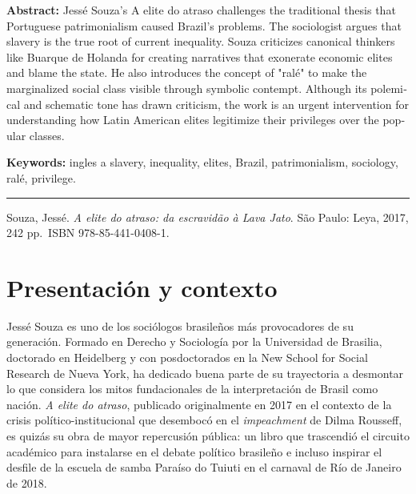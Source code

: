 \documentclass{article}
\renewcommand{\normalsize}{\fontsize{10pt}{13pt}\selectfont}
\renewenvironment{quote}{\normalsize\list{}{\sf\leftmargin=14pt\rightmargin=0pt}\item\relax}{\endlist}
\begin{document}
\begin{tcolorbox}[colback=brown!8!white,colframe=brown!8!white,boxrule=0pt,arc=2pt,left=4pt,right=4pt,top=3pt,bottom=3pt,before skip=4pt,after skip=4pt]
\begin{otherlanguage}{english}
\sffamily\small \textbf{Abstract:} Jessé Souza's A elite do atraso challenges the traditional thesis that Portuguese patrimonialism caused Brazil's problems. The sociologist argues that slavery is the true root of current inequality. Souza criticizes canonical thinkers like Buarque de Holanda for creating narratives that exonerate economic elites and blame the state. He also introduces the concept of "ralé" to make the marginalized social class visible through symbolic contempt. Although its polemical and schematic tone has drawn criticism, the work is an urgent intervention for understanding how Latin American elites legitimize their privileges over the popular classes.
\par\smallskip\noindent\textbf{Keywords:} ingles a slavery, inequality, elites, Brazil, patrimonialism, sociology, ralé, privilege.
\end{otherlanguage}
\end{tcolorbox}

\bigskip
\noindent\rule{\linewidth}{0.4pt}
\bigskip


\begin{quote}
Souza, Jessé. \textit{A elite do atraso: da escravidão à Lava Jato}. São Paulo: Leya, 2017, 242 pp. ISBN 978-85-441-0408-1.

\end{quote}

\section{Presentación y contexto}
Jessé Souza es uno de los sociólogos brasileños más provocadores de su generación. Formado en Derecho y Sociología por la Universidad de Brasilia, doctorado en Heidelberg y con posdoctorados en la New School for Social Research de Nueva York, ha dedicado buena parte de su trayectoria a desmontar lo que considera los mitos fundacionales de la interpretación de Brasil como nación. \textit{A elite do atraso}, publicado originalmente en 2017 en el contexto de la crisis político-institucional que desembocó en el \textit{impeachment} de Dilma Rousseff, es quizás su obra de mayor repercusión pública: un libro que trascendió el circuito académico para instalarse en el debate político brasileño e incluso inspirar el desfile de la escuela de samba Paraíso do Tuiuti en el carnaval de Río de Janeiro de 2018.
\end{document}
